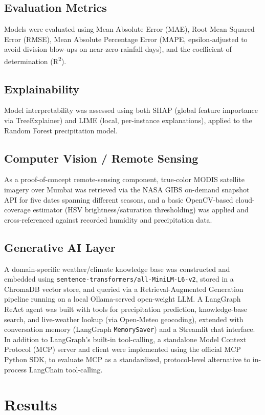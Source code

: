 \documentclass[11pt]{article}
\begin{document}
\subsection{Evaluation Metrics}
Models were evaluated using Mean Absolute Error (MAE), Root Mean Squared Error (RMSE), Mean Absolute Percentage Error (MAPE, epsilon-adjusted to avoid division blow-ups on near-zero-rainfall days), and the coefficient of determination (R\textsuperscript{2}).

\subsection{Explainability}
Model interpretability was assessed using both SHAP (global feature importance via TreeExplainer) and LIME (local, per-instance explanations), applied to the Random Forest precipitation model.

\subsection{Computer Vision / Remote Sensing}
As a proof-of-concept remote-sensing component, true-color MODIS satellite imagery over Mumbai was retrieved via the NASA GIBS on-demand snapshot API for five dates spanning different seasons, and a basic OpenCV-based cloud-coverage estimator (HSV brightness/saturation thresholding) was applied and cross-referenced against recorded humidity and precipitation data.

\subsection{Generative AI Layer}
A domain-specific weather/climate knowledge base was constructed and embedded using \texttt{sentence-transformers/all-MiniLM-L6-v2}, stored in a ChromaDB vector store, and queried via a Retrieval-Augmented Generation pipeline running on a local Ollama-served open-weight LLM. A LangGraph ReAct agent was built with tools for precipitation prediction, knowledge-base search, and live-weather lookup (via Open-Meteo geocoding), extended with conversation memory (LangGraph \texttt{MemorySaver}) and a Streamlit chat interface. In addition to LangGraph's built-in tool-calling, a standalone Model Context Protocol (MCP) server and client were implemented using the official MCP Python SDK, to evaluate MCP as a standardized, protocol-level alternative to in-process LangChain tool-calling.

\section{Results}
\end{document}
